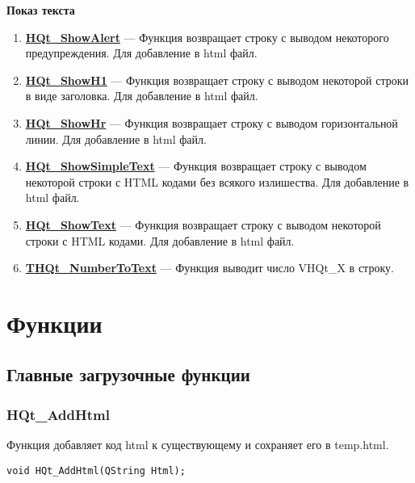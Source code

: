 \documentclass[a4paper,12pt]{article}
\begin{document}
\textbf{Показ текста}
\begin{enumerate}

\item \textbf{\hyperref[HQt_ShowAlert]{HQt\_ShowAlert}} --- Функция возвращает строку с выводом некоторого предупреждения. Для добавление в html файл.

\item \textbf{\hyperref[HQt_ShowH1]{HQt\_ShowH1}} --- Функция возвращает строку с выводом некоторой строки в виде заголовка. Для добавление в html файл.

\item \textbf{\hyperref[HQt_ShowHr]{HQt\_ShowHr}} --- Функция возвращает строку с выводом горизонтальной линии. Для добавление в html файл.

\item \textbf{\hyperref[HQt_ShowSimpleText]{HQt\_ShowSimpleText}} --- Функция возвращает строку с выводом некоторой строки с HTML кодами без всякого излишества. Для добавление в html файл.

\item \textbf{\hyperref[HQt_ShowText]{HQt\_ShowText}} --- Функция возвращает строку с выводом некоторой строки с HTML кодами. Для добавление в html файл.

\item \textbf{\hyperref[THQt_NumberToText]{THQt\_NumberToText}} --- Функция выводит число VHQt\_X в строку.

\end{enumerate}


\newpage
\section{Функции}
\subsection{Главные загрузочные функции}

\subsubsection{HQt\_AddHtml}\label{HQt_AddHtml}

Функция добавляет код html к существующему и сохраняет его в temp.html.


\begin{lstlisting}[label=code_syntax_HQt_AddHtml,caption=Синтаксис]
void HQt_AddHtml(QString Html);
\end{lstlisting}
\end{document}
